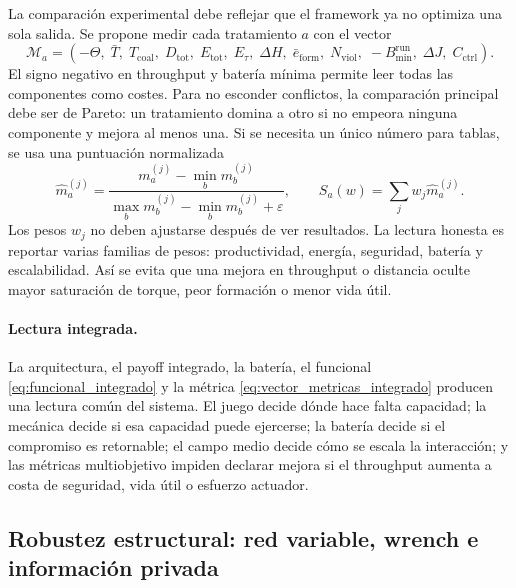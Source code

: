 La comparación experimental debe reflejar que el framework ya no optimiza una sola
salida. Se propone medir cada tratamiento $a$ con el vector
\begin{equation}
  \mathcal M_a=
  \left(
  -\Theta,\;
  \bar T,\;
  T_{\mathrm{coal}},\;
  D_{\mathrm{tot}},\;
  E_{\mathrm{tot}},\;
  E_\tau,\;
  \Delta H,\;
  \bar e_{\mathrm{form}},\;
  N_{\mathrm{viol}},\;
  -B_{\min}^{\mathrm{run}},\;
  \Delta J,\;
  C_{\mathrm{ctrl}}
  \right).
  \label{eq:vector_metricas_integrado}
\end{equation}
El signo negativo en throughput y batería mínima permite leer todas las componentes
como costes. Para no esconder conflictos, la comparación principal debe ser de Pareto:
un tratamiento domina a otro si no empeora ninguna componente y mejora al menos una. Si
se necesita un único número para tablas, se usa una puntuación normalizada
\begin{equation}
  \widehat m_a^{(j)}
  =
  \frac{m_a^{(j)}-\min_b m_b^{(j)}}
       {\max_b m_b^{(j)}-\min_b m_b^{(j)}+\varepsilon},
  \qquad
  S_a(w)=\sum_j w_j\widehat m_a^{(j)} .
  \label{eq:score_metricas_integrado}
\end{equation}
Los pesos $w_j$ no deben ajustarse después de ver resultados. La lectura honesta es
reportar varias familias de pesos: productividad, energía, seguridad, batería y
escalabilidad. Así se evita que una mejora en throughput o distancia oculte mayor
saturación de torque, peor formación o menor vida útil.

\paragraph{Lectura integrada.}
La arquitectura, el payoff integrado, la batería, el funcional
\eqref{eq:funcional_integrado} y la métrica \eqref{eq:vector_metricas_integrado}
producen una lectura común del sistema. El juego decide dónde hace falta capacidad; la
mecánica decide si esa capacidad puede ejercerse; la batería decide si el compromiso es
retornable; el campo medio decide cómo se escala la interacción; y las métricas
multiobjetivo impiden declarar mejora si el throughput aumenta a costa de seguridad,
vida útil o esfuerzo actuador.

\subsection{Robustez estructural: red variable, wrench e información privada}
\label{subsec:robustez-estructural}

